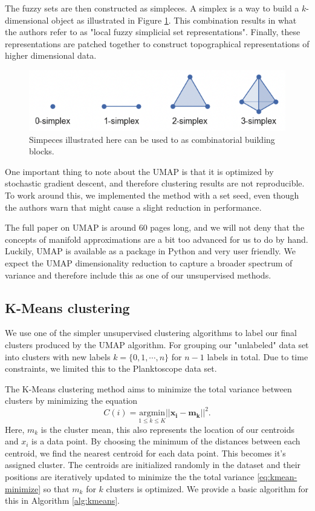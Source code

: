 The fuzzy sets are then constructed as simpleces. A simplex is a way to build a $k$-dimensional object as illustrated in Figure \ref{fig:simpleces}. This combination results in what the authors refer to as "local fuzzy simplicial set representations". Finally, these representations are patched together to construct topographical representations of higher dimensional data. 

\begin{figure}[H]
    \centering
    \includegraphics[width=1\linewidth]{examples/tests_eb/figs/Skjermbilde 2024-12-05 kl. 16.56.40.png}
    \caption{Simpeces illustrated here can be used to as combinatorial building blocks.}
    \label{fig:simpleces}
\end{figure}

One important thing to note about the UMAP is that it is optimized by stochastic gradient descent, and therefore clustering results are not reproducible. To work around this, we implemented the method with a set seed, even though the authors warn that might cause a slight reduction in performance. 

The full paper on UMAP is around 60 pages long, and we will not deny that the concepts of manifold approximations are a bit too advanced for us to do by hand. Luckily, UMAP is available as a package in Python and very user friendly. We expect the UMAP dimensionality reduction to capture a broader spectrum of variance and therefore include this as one of our unsupervised methods.

\subsection{K-Means clustering}
We use one of the simpler unsupervised clustering algorithms to label our final clusters produced by the UMAP algorithm. For grouping our "unlabeled" data set into clusters with new labels $k = \{0, 1, \cdots , n\}$ for $n-1$ labels in total. Due to time constraints, we limited this to the Planktoscope data set. 

The K-Means clustering method aims to minimize the total variance between clusters by minimizing the equation 
$$
C(i) = \underset{1\leq k\leq K}{\mathrm{argmin}} ||\boldsymbol{x_i} - \boldsymbol{m_k}||^2.
$$\label{eq:kmean-minimize}
Here, $m_k$ is the cluster mean, this also represents the location of our centroids and $x_i$ is a data point. By choosing the minimum of the distances between each centroid, we find the nearest centroid for each data point. This becomes it's assigned cluster. The centroids are initialized randomly in the dataset and their positions are iteratively updated to minimize the the total variance \ref{eq:kmean-minimize} so that $m_k$ for $k$ clusters is optimized. We provide a basic algorithm for this in Algorithm \ref{alg:kmeans}.

